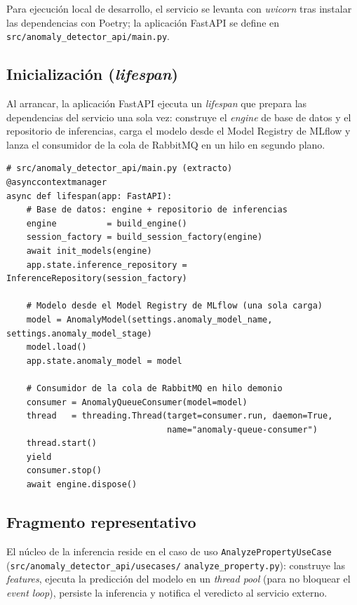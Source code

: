 Para ejecución local de desarrollo, el servicio se levanta con \textit{uvicorn}
tras instalar las dependencias con Poetry; la aplicación FastAPI se define en
\texttt{src/anomaly\_detector\_api/main.py}.

\subsection{Inicialización (\textit{lifespan})}

Al arrancar, la aplicación FastAPI ejecuta un \textit{lifespan} que prepara las
dependencias del servicio una sola vez: construye el \textit{engine} de base de
datos y el repositorio de inferencias, carga el modelo desde el Model Registry de
MLflow y lanza el consumidor de la cola de RabbitMQ en un hilo en segundo plano.

\begin{lstlisting}[style=pythonstyle]
# src/anomaly_detector_api/main.py (extracto)
@asynccontextmanager
async def lifespan(app: FastAPI):
    # Base de datos: engine + repositorio de inferencias
    engine          = build_engine()
    session_factory = build_session_factory(engine)
    await init_models(engine)
    app.state.inference_repository = InferenceRepository(session_factory)

    # Modelo desde el Model Registry de MLflow (una sola carga)
    model = AnomalyModel(settings.anomaly_model_name, settings.anomaly_model_stage)
    model.load()
    app.state.anomaly_model = model

    # Consumidor de la cola de RabbitMQ en hilo demonio
    consumer = AnomalyQueueConsumer(model=model)
    thread   = threading.Thread(target=consumer.run, daemon=True,
                                name="anomaly-queue-consumer")
    thread.start()
    yield
    consumer.stop()
    await engine.dispose()
\end{lstlisting}

\subsection{Fragmento representativo}

El núcleo de la inferencia reside en el caso de uso
\texttt{AnalyzePropertyUseCase} (\texttt{src/anomaly\_detector\_api/usecases/}
\texttt{analyze\_property.py}): construye las \textit{features}, ejecuta la
predicción del modelo en un \textit{thread pool} (para no bloquear el
\textit{event loop}), persiste la inferencia y notifica el veredicto al servicio
externo.

